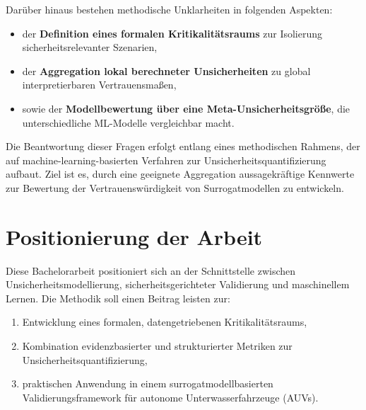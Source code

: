 Darüber hinaus bestehen methodische Unklarheiten in folgenden Aspekten:

\begin{itemize}
  \item der \textbf{Definition eines formalen Kritikalitätsraums} zur Isolierung sicherheitsrelevanter Szenarien,
  \item der \textbf{Aggregation lokal berechneter Unsicherheiten} zu global interpretierbaren Vertrauensmaßen,
  \item sowie der \textbf{Modellbewertung über eine Meta-Unsicherheitsgröße}, die unterschiedliche ML-Modelle vergleichbar macht.
\end{itemize}

Die Beantwortung dieser Fragen erfolgt entlang eines methodischen Rahmens, der auf machine-learning-basierten Verfahren zur Unsicherheitsquantifizierung aufbaut. Ziel ist es, durch eine geeignete Aggregation aussagekräftige Kennwerte zur Bewertung der Vertrauenswürdigkeit von Surrogatmodellen zu entwickeln.

\section{Positionierung der Arbeit}

Diese Bachelorarbeit positioniert sich an der Schnittstelle zwischen Unsicherheitsmodellierung, sicherheitsgerichteter Validierung und maschinellem Lernen. Die Methodik soll einen Beitrag leisten zur:

\begin{enumerate}
  \item Entwicklung eines formalen, datengetriebenen Kritikalitätsraums,
  \item Kombination evidenzbasierter und strukturierter Metriken zur Unsicherheitsquantifizierung,
  \item praktischen Anwendung in einem surrogatmodellbasierten Validierungsframework für autonome Unterwasserfahrzeuge (AUVs).
\end{enumerate}
